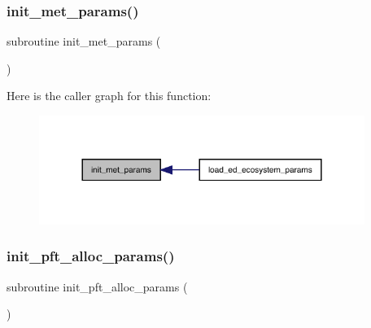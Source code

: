 \subsubsection{\texorpdfstring{init\+\_\+met\+\_\+params()}{init\_met\_params()}}
{\footnotesize\ttfamily subroutine init\+\_\+met\+\_\+params (\begin{DoxyParamCaption}{ }\end{DoxyParamCaption})}

Here is the caller graph for this function\+:
\nopagebreak
\begin{figure}[H]
\begin{center}
\leavevmode
\includegraphics[width=300pt]{ed__params_8f90_a82e540d1abc17b344e25567cce30f2fc_icgraph}
\end{center}
\end{figure}
\mbox{\label{ed__params_8f90_a3e351a017b9f9f9ef7843e9f7041be82}} 
\subsubsection{\texorpdfstring{init\+\_\+pft\+\_\+alloc\+\_\+params()}{init\_pft\_alloc\_params()}}
{\footnotesize\ttfamily subroutine init\+\_\+pft\+\_\+alloc\+\_\+params (\begin{DoxyParamCaption}{ }\end{DoxyParamCaption})}

